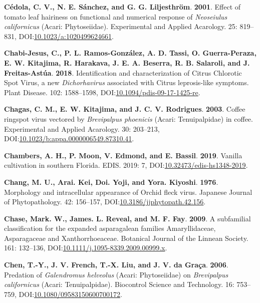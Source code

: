 \documentclass[12pt,final,CPage]{ufthesis}
\newlength{\cslhangindent}
\newenvironment{CSLReferences}[2] %
{%
	\setlength{\parindent}{0pt}
	\ifodd #1 \everypar{\setlength{\hangindent}{\cslhangindent}}\ignorespaces\fi
	\ifnum #2 > 0
	\setlength{\parskip}{#2\baselineskip}
	\fi
}%
{}
\begin{document}
{\begin{CSLReferences}{1}{0}
  \leavevmode{}%
  \textbf{Cédola, C. V., N. E. Sánchez, and G. G. Liljesthröm}. \textbf{2001}. Effect of tomato leaf hairiness on functional and numerical response of {\emph{Neoseiulus californicus}} ({Acari}: {Phytoseiidae}). Experimental and Applied Acarology. 25: 819--831, DOI:\href{https://doi.org/10.1023/a:1020499624661}{10.1023/a:1020499624661}.

  \leavevmode{}%
  \textbf{Chabi-Jesus, C., P. L. Ramos-González, A. D. Tassi, O. Guerra-Peraza, E. W. Kitajima, R. Harakava, J. E. A. Beserra, R. B. Salaroli, and J. Freitas-Astúa}. \textbf{2018}. Identification and characterization of {Citrus Chlorotic Spot Virus}, a new {\emph{Dichorhavirus}} associated with {Citrus leprosis}-like symptoms. Plant Disease. 102: 1588--1598, DOI:\href{https://doi.org/10.1094/pdis-09-17-1425-re}{10.1094/pdis-09-17-1425-re}.

  \leavevmode{}%
  \textbf{Chagas, C. M., E. W. Kitajima, and J. C. V. Rodrigues}. \textbf{2003}. {Coffee ringspot virus} vectored by {\emph{Brevipalpus phoenicis}} ({Acari}: {Tenuipalpidae}) in coffee. Experimental and Applied Acarology. 30: 203--213, DOI:\href{https://doi.org/10.1023/b:appa.0000006549.87310.41}{10.1023/b:appa.0000006549.87310.41}.

  \leavevmode{}%
  \textbf{Chambers, A. H., P. Moon, V. Edmond, and E. Bassil}. \textbf{2019}. Vanilla cultivation in southern {Florida}. {EDIS}. 2019: 7, DOI:\href{https://doi.org/10.32473/edis-hs1348-2019}{10.32473/edis-hs1348-2019}.

  \leavevmode{}%
  \textbf{Chang, M. U., Arai. Kei, Doi. Yoji, and Yora. Kiyoshi}. \textbf{1976}. Morphology and intracellular appearance of {Orchid fleck virus}. Japanese Journal of Phytopathology. 42: 156--157, DOI:\href{https://doi.org/10.3186/jjphytopath.42.156}{10.3186/jjphytopath.42.156}.

  \leavevmode{}%
  \textbf{Chase, Mark. W., James. L. Reveal, and M. F. Fay}. \textbf{2009}. A subfamilial classification for the expanded asparagalean families {Amaryllidaceae}, {Asparagaceae} and {Xanthorrhoeaceae}. Botanical Journal of the Linnean Society. 161: 132--136, DOI:\href{https://doi.org/10.1111/j.1095-8339.2009.00999.x}{10.1111/j.1095-8339.2009.00999.x}.

  \leavevmode{}%
  \textbf{Chen, T.-Y., J. V. French, T.-X. Liu, and J. V. da Graça}. \textbf{2006}. Predation of {\emph{Galendromus helveolus}} ({Acari}: {Phytoseiidae}) on {\emph{Brevipalpus californicus}} ({Acari}: {Tenuipalpidae}). Biocontrol Science and Technology. 16: 753--759, DOI:\href{https://doi.org/10.1080/09583150600700172}{10.1080/09583150600700172}.


\end{CSLReferences}}
\end{document}

